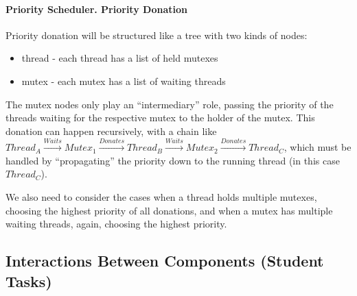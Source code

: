 \begin{tcolorbox}[title={Example}]
\paragraph{Priority Scheduler. Priority Donation} Priority donation will be structured like a tree with two kinds of nodes:
\begin{itemize}
    \item thread - each thread has a list of held mutexes
    \item mutex - each mutex has a list of waiting threads
\end{itemize}
The mutex nodes only play an ``intermediary'' role, passing the priority of the threads waiting for the respective mutex
to the holder of the mutex. This donation can happen recursively, with a chain like
$Thread_A \xrightarrow{Waits} Mutex_1 \xrightarrow{Donates} Thread_B \xrightarrow{Waits} Mutex_2 \xrightarrow{Donates} Thread_C$,
which must be handled by ``propagating'' the priority down to the running thread (in this case $Thread_C$).

We also need to consider the cases when a thread holds multiple mutexes, choosing the highest priority of all donations, and when a mutex has multiple
waiting threads, again, choosing the highest priority.
\end{tcolorbox}

\subsubsection{\taskA}


\subsubsection{\taskB}


\subsubsection{\taskC}


\subsection{Interactions Between Components (Student Tasks)}

